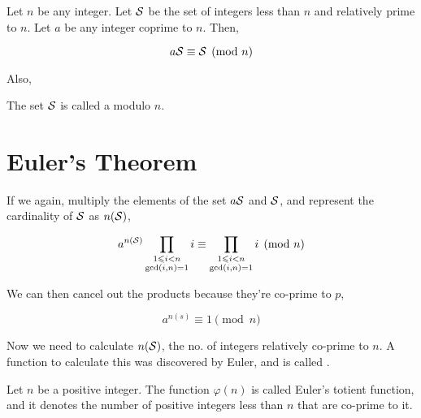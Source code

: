 \begin{theorem} 
    Let \(n\) be any integer. Let \(\mathcal{S}\) be the set of integers less
    than \(n\) and relatively prime to \(n\). Let \(a\) be any integer coprime to \(n\). Then,

    \begin{equation}
        a\mathcal{S} \equiv \mathcal{S} \pmod{n}
    \end{equation}

\end{theorem}

Also, 

\begin{definition}
    The set \(\mathcal{S}\) is called a  modulo \(n\).
\end{definition}

\section{Euler's Theorem}

If we again, multiply the elements of the set \(a\mathcal{S}\) and \(\mathcal{S}\), and represent the cardinality of \(\mathcal{S}\) as \(n(\mathcal{S})\),

\begin{equation*}
    a^{n(\mathcal{S})} \prod_{\begin{subarray}{c} 1 \leqslant i < n \\ \gcd(i, n) = 1 \end{subarray}}i \equiv \prod_{\begin{subarray}{c} 1 \leqslant i < n \\ \gcd(i, n) = 1 \end{subarray}}i \pmod{n}
\end{equation*}

We can then cancel out the products because they're co-prime to \(p\), 

\begin{equation*}
    a^{n(s)} \equiv 1 \pmod{n}
\end{equation*}

Now we need to calculate \(n(\mathcal{S})\), the no. of integers relatively co-prime to \(n\).
A function to calculate this was discovered by Euler, and is called .

\begin{definition}
    Let \(n\) be a positive integer. The function \(\varphi(n)\) is called Euler's totient
    function, and it denotes the number of positive integers less than \(n\) that are co-prime to it.
\end{definition}

